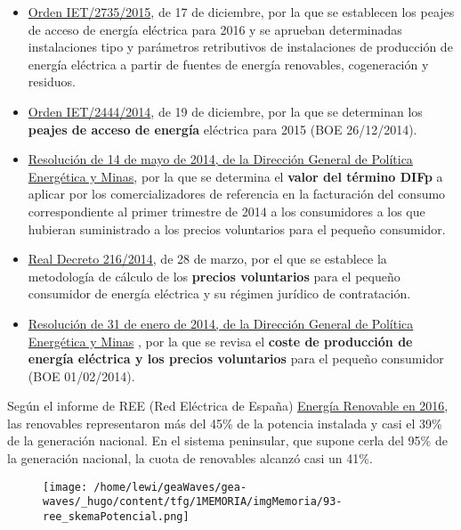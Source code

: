 \begin{itemize}
\item
  \href{https://www.boe.es/diario_boe/txt.php?id=BOE-A-2015-13782}{Orden
  IET/2735/2015}, de 17 de diciembre, por la que se establecen los
  peajes de acceso de energía eléctrica para 2016 y se aprueban
  determinadas instalaciones tipo y parámetros retributivos de
  instalaciones de producción de energía eléctrica a partir de fuentes
  de energía renovables, cogeneración y residuos.
\item
  \href{http://www.boe.es/diario_boe/txt.php?id=BOE-A-2014-13475}{Orden
  IET/2444/2014}, de 19 de diciembre, por la que se determinan los
  \textbf{peajes de acceso de energía} eléctrica para 2015 (BOE
  26/12/2014).
\item
  \href{https://www.boe.es/diario_boe/txt.php?id=BOE-A-2014-5173}{Resolución
  de 14 de mayo de 2014, de la Dirección General de Política Energética
  y Minas}, por la que se determina el \textbf{valor del término DIFp} a
  aplicar por los comercializadores de referencia en la facturación del
  consumo correspondiente al primer trimestre de 2014 a los consumidores
  a los que hubieran suministrado a los precios voluntarios para el
  pequeño consumidor.
\item
  \href{http://www.boe.es/diario_boe/txt.php?id=BOE-A-2014-3376}{Real
  Decreto 216/2014}, de 28 de marzo, por el que se establece la
  metodología de cálculo de los \textbf{precios voluntarios} para el
  pequeño consumidor de energía eléctrica y su régimen jurídico de
  contratación.
\item
  \href{http://www.boe.es/diario_boe/txt.php?id=BOE-A-2014-1053}{Resolución
  de 31 de enero de 2014, de la Dirección General de Política Energética
  y Minas} , por la que se revisa el \textbf{coste de producción de
  energía eléctrica y los precios voluntarios} para el pequeño
  consumidor (BOE 01/02/2014).
\end{itemize}

Según el informe de REE (Red Eléctrica de España)
\href{http://www.ree.es/es/estadisticas-del-sistema-electrico-espanol/informe-de-energias-renovables}{Energía
Renovable en 2016}, las renovables representaron más del 45\% de la
potencia instalada y casi el 39\% de la generación nacional. En el
sistema peninsular, que supone cerla del 95\% de la generación nacional,
la cuota de renovables alcanzó casi un 41\%.

\begin{figure}
\centering
\texttt{[image: /home/lewi/geaWaves/gea-waves/\_hugo/content/tfg/1MEMORIA/imgMemoria/93-ree\_skemaPotencial.png]}
\caption{}
\end{figure}


